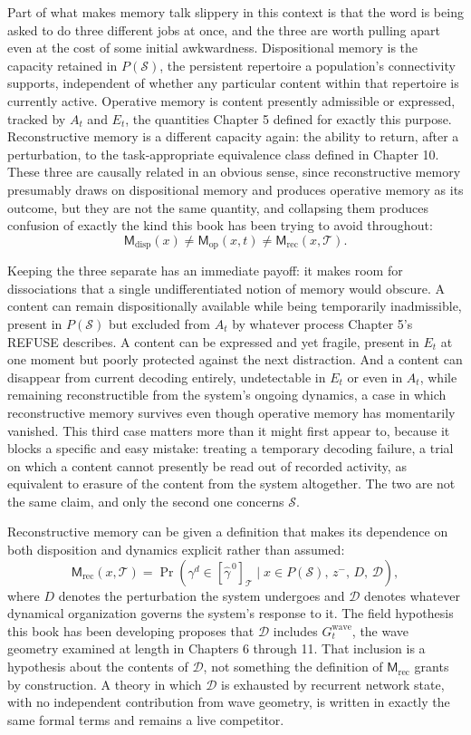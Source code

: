 \documentclass[11pt]{book}
\begin{document}
Part of what makes memory talk slippery in this context is that the word is being asked to do three different jobs at once, and the three are worth pulling apart even at the cost of some initial awkwardness. Dispositional memory is the capacity retained in $P(\mathcal S)$, the persistent repertoire a population's connectivity supports, independent of whether any particular content within that repertoire is currently active. Operative memory is content presently admissible or expressed, tracked by $A_t$ and $E_t$, the quantities Chapter 5 defined for exactly this purpose. Reconstructive memory is a different capacity again: the ability to return, after a perturbation, to the task-appropriate equivalence class defined in Chapter 10. These three are causally related in an obvious sense, since reconstructive memory presumably draws on dispositional memory and produces operative memory as its outcome, but they are not the same quantity, and collapsing them produces confusion of exactly the kind this book has been trying to avoid throughout:
\[
\mathsf M_{\mathrm{disp}}(x)
\neq
\mathsf M_{\mathrm{op}}(x,t)
\neq
\mathsf M_{\mathrm{rec}}(x,\mathcal T).
\]

Keeping the three separate has an immediate payoff: it makes room for dissociations that a single undifferentiated notion of memory would obscure. A content can remain dispositionally available while being temporarily inadmissible, present in $P(\mathcal S)$ but excluded from $A_t$ by whatever process Chapter 5's REFUSE describes. A content can be expressed and yet fragile, present in $E_t$ at one moment but poorly protected against the next distraction. And a content can disappear from current decoding entirely, undetectable in $E_t$ or even in $A_t$, while remaining reconstructible from the system's ongoing dynamics, a case in which reconstructive memory survives even though operative memory has momentarily vanished. This third case matters more than it might first appear to, because it blocks a specific and easy mistake: treating a temporary decoding failure, a trial on which a content cannot presently be read out of recorded activity, as equivalent to erasure of the content from the system altogether. The two are not the same claim, and only the second one concerns $\mathcal S$.

Reconstructive memory can be given a definition that makes its dependence on both disposition and dynamics explicit rather than assumed:
\[
\mathsf M_{\mathrm{rec}}(x,\mathcal T)
=
\Pr\!\left(
\gamma^{d}
\in
[\widehat{\gamma}^{\,0}]_{\mathcal T}
\mid
x\in P(\mathcal S),\,
z^{-},\,
D,\,
\mathcal D
\right),
\]
where $D$ denotes the perturbation the system undergoes and $\mathcal D$ denotes whatever dynamical organization governs the system's response to it. The field hypothesis this book has been developing proposes that $\mathcal D$ includes $G_t^{\mathrm{wave}}$, the wave geometry examined at length in Chapters 6 through 11. That inclusion is a hypothesis about the contents of $\mathcal D$, not something the definition of $\mathsf M_{\mathrm{rec}}$ grants by construction. A theory in which $\mathcal D$ is exhausted by recurrent network state, with no independent contribution from wave geometry, is written in exactly the same formal terms and remains a live competitor.
\end{document}
